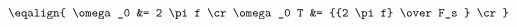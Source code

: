 \hsize 0pt
\vsize 0pt
\nopagenumbers
\overfullrule 0pt
\noindent
$$
\eqalign{
\omega_0 &= 2 \pi f \cr
\omega_0 T &= {{2 \pi f} \over F_s } \cr
}
$$
\bye
